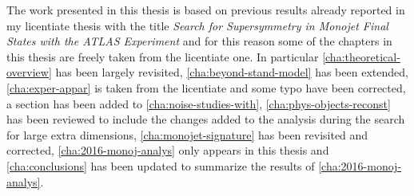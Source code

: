 The work presented in this thesis is based on previous results already reported
in my licentiate thesis with the title \emph{Search for Supersymmetry in
  Monojet Final States with the ATLAS Experiment} and for this reason some of
the chapters in this thesis are freely taken from the licentiate one. In
particular \cref{cha:theoretical-overview} has been largely revisited,
\cref{cha:beyond-stand-model} has been extended, \cref{cha:exper-appar} is taken
from the licentiate and some typo have been corrected, a section has been added to
\cref{cha:noise-studies-with}, \cref{cha:phys-objects-reconst} has been reviewed
to include the changes added to the analysis during the search for large extra
dimensions, \cref{cha:monojet-signature} has been revisited and corrected,
\cref{cha:2016-monoj-analys} only appears in this thesis and
\cref{cha:conclusions} has been updated to summarize the results of
\cref{cha:2016-monoj-analys}.
